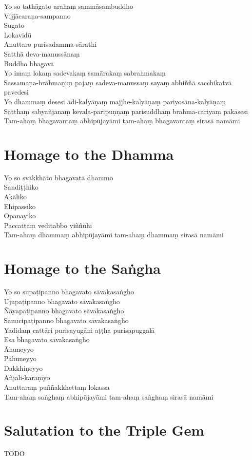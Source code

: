 Yo so tathāgato arahaṃ sammāsambuddho\\
Vijjācaraṇa-sampanno\\
Sugato\\
Lokavidū\\
Anuttaro purisadamma-sārathi\\
Satthā deva-manussānaṃ\\
Buddho bhagavā\\
Yo imaṃ lokaṃ sadevakaṃ samārakaṃ sabrahmakaṃ\\
Sassamaṇa-brāhmaṇiṃ pajaṃ sadeva-manussaṃ sayaṃ abhiññā sacchikatvā pavedesi\\
Yo dhammaṃ desesi ādi-kalyāṇaṃ majjhe-kalyāṇaṃ pariyosāna-kalyāṇaṃ\\
Sātthaṃ sabyañjanaṃ kevala-paripuṇṇaṃ parisuddhaṃ brahma-cariyaṃ pakāsesi\\
Tam-ahaṃ bhagavantaṃ abhipūjayāmi tam-ahaṃ bhagavantaṃ sirasā namāmi

\section{Homage to the Dhamma}

\begin{leader}
\end{leader}

Yo so svākkhāto bhagavatā dhammo\\
Sandiṭṭhiko\\
Akāliko\\
Ehipassiko\\
Opanayiko\\
Paccattaṃ veditabbo viññūhi\\
Tam-ahaṃ dhammaṃ abhipūjayāmi tam-ahaṃ dhammaṃ sirasā namāmi

\section{Homage to the Saṅgha}

\begin{leader}
\end{leader}

Yo so supaṭipanno bhagavato sāvakasaṅgho\\
Ujupaṭipanno bhagavato sāvakasaṅgho\\
Ñāyapaṭipanno bhagavato sāvakasaṅgho\\
Sāmīcipaṭipanno bhagavato sāvakasaṅgho\\
Yadidaṃ cattāri purisayugāni aṭṭha purisapuggalā\\
Esa bhagavato sāvakasaṅgho\\
Āhuneyyo\\
Pāhuneyyo\\
Dakkhiṇeyyo\\
Añjali-karaṇīyo\\
Anuttaraṃ puññakkhettaṃ lokassa\\
Tam-ahaṃ saṅghaṃ abhipūjayāmi tam-ahaṃ saṅghaṃ sirasā namāmi

\section{Salutation to the Triple Gem}

TODO


